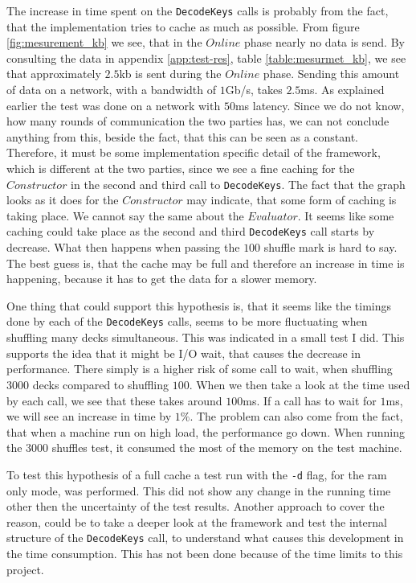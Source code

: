 \documentclass[twoside,11pt,openright]{report}
\begin{document}
The increase in time spent on the \verb|DecodeKeys| calls is probably from the fact, that the implementation tries to cache as much as possible. From figure \ref{fig:mesurement_kb} we see, that in the $Online$ phase nearly no data is send. By consulting the data in appendix \ref{app:test-res}, table \ref{table:mesurmet_kb}, we see that approximately $2.5$kb is sent during the $Online$ phase. Sending this amount of data on a network, with a bandwidth of $1$Gb/s, takes $2.5$ms. As explained earlier the test was done on a network with $50$ms latency. Since we do not know, how many rounds of communication the two parties has, we can not conclude anything from this, beside the fact, that this can be seen as a constant. Therefore, it must be some implementation specific detail of the framework, which is different at the two parties, since we see a fine caching for the $Constructor$ in the second and third call to \verb|DecodeKeys|. The fact that the graph looks as it does for the $Constructor$ may indicate, that some form of caching is taking place. We cannot say the same about the $Evaluator$. It seems like some caching could take place as the second and third \verb|DecodeKeys| call starts by decrease. What then happens when passing the $100$ shuffle mark is hard to say. The best guess is, that the cache may be full and therefore an increase in time is happening, because it has to get the data for a slower memory.

One thing that could support this hypothesis is, that it seems like the timings done by each of the \verb|DecodeKeys| calls, seems to be more fluctuating when shuffling many decks simultaneous. This was indicated in a small test I did. This supports the idea that it might be I/O wait, that causes the decrease in performance. There simply is a higher risk of some call to wait, when shuffling $3000$ decks compared to shuffling $100$. When we then take a look at the time used by each call, we see that these takes around $100$ms. If a call has to wait for $1$ms, we will see an increase in time by $1\%$. The problem can also come from the fact, that when a machine run on high load, the performance go down. When running the $3000$ shuffles test, it consumed the most of the memory on the test machine.

To test this hypothesis of a full cache a test run with the \verb|-d| flag, for the ram only mode, was performed. This did not show any change in the running time other then the uncertainty of the test results. Another approach to cover the reason, could be to take a deeper look at the framework and test the internal structure of the \verb|DecodeKeys| call, to understand what causes this development in the time consumption. This has not been done because of the time limits to this project.
\end{document}
